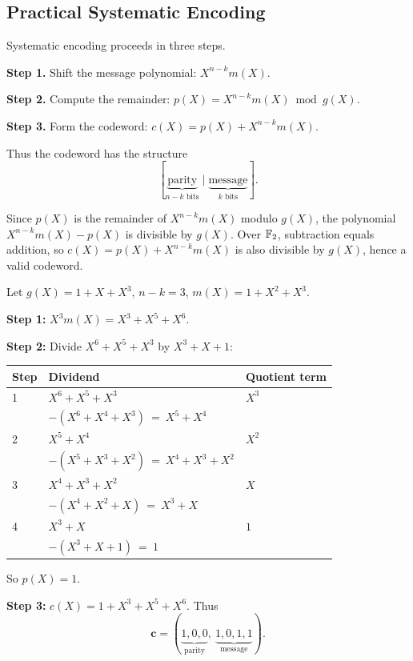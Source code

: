 \newpage
\subsection{Practical Systematic Encoding}

Systematic encoding proceeds in three steps.

\medskip
\textbf{Step 1.} Shift the message polynomial: \(X^{n-k}m(X)\).

\textbf{Step 2.} Compute the remainder: \(p(X)=X^{n-k}m(X) \bmod g(X)\).

\textbf{Step 3.} Form the codeword: \(c(X)=p(X)+X^{n-k}m(X)\).

Thus the codeword has the structure
\[[\underbrace{\text{parity}}_{n-k\text{ bits}} \mid \underbrace{\text{message}}_{k\text{ bits}}].\]

\begin{remark}
Since \(p(X)\) is the remainder of \(X^{n-k}m(X)\) modulo \(g(X)\), the polynomial \(X^{n-k}m(X)-p(X)\) is divisible by \(g(X)\). Over \(\mathbb{F}_2\), subtraction equals addition, so \(c(X)=p(X)+X^{n-k}m(X)\) is also divisible by \(g(X)\), hence a valid codeword.
\end{remark}

\begin{example}
Let \(g(X)=1+X+X^3\), \(n-k=3\), \(m(X)=1+X^2+X^3\).

\textbf{Step 1:} \(X^3m(X)=X^3+X^5+X^6\).

\textbf{Step 2:} Divide \(X^6+X^5+X^3\) by \(X^3+X+1\):
\begin{center}
\renewcommand{\arraystretch}{1.2}
\begin{tabular}{@{}lll@{}}
	\toprule
	Step & Dividend & Quotient term \\
	\midrule
	1 & \(X^6 + X^5 + X^3\) & \(X^3\) \\
	  & \(-(X^6 + X^4 + X^3)\ =\ X^5 + X^4\) & \\
	2 & \(X^5 + X^4\) & \(X^2\) \\
	  & \(-(X^5 + X^3 + X^2)\ =\ X^4 + X^3 + X^2\) & \\
	3 & \(X^4 + X^3 + X^2\) & \(X\) \\
	  & \(-(X^4 + X^2 + X)\ =\ X^3 + X\) & \\
	4 & \(X^3 + X\) & \(1\) \\
	  & \(-(X^3 + X + 1)\ =\ 1\) & \\
	\bottomrule
\end{tabular}
\end{center}
So \(p(X)=1\).

\textbf{Step 3:} \(c(X)=1+X^3+X^5+X^6\). Thus
\[\mathbf{c}=(\underbrace{1,0,0}_{\text{parity}},\ \underbrace{1,0,1,1}_{\text{message}}).\]
\end{example}

